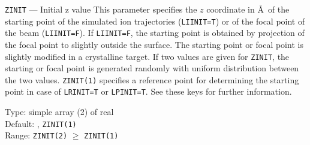 \begin{keydescription}{\texttt{ZINIT} --- Initial z value}
%
  This parameter specifies the $z$ coordinate in \AA\ of the starting point of
  the simulated ion trajectories (\texttt{LIINIT=T}) or of the focal point of the
  beam (\texttt{LIINIT=F}). If \texttt{LIINIT=F}, the starting point is obtained
  by projection of the focal point to slightly outside the surface. The starting
  point or focal point is slightly modified in a crystalline target. If
  two values are given for \texttt{ZINIT}, the starting or focal point is
  generated randomly with uniform distribution between the two values.
  \ifprivate 
    \texttt{ZINIT(1)} specifies a reference point for determining the
    starting point in case of \texttt{LRINIT=T} or \texttt{LPINIT=T}.
    See these keys for further information.
  \fi
%
  \begin{keytab}
    Type:    \> simple array (2) of real \\
    Default: , \texttt{ZINIT(1)} \\
    Range:   \> \texttt{ZINIT(2)} $\ge$ \texttt{ZINIT(1)}
  \end{keytab}
\end{keydescription}

